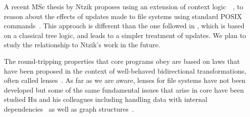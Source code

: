 A recent MSc thesis by Ntzik proposes using an extension of context
logic~\cite{context-logic}~\cite{segment-logic}, to reason about the
effects of updates made to file systems using standard POSIX
commands~\cite{ntzik-msc}. This approach is different than the one
followed in \forest{}, which is based on a classical tree logic, and
leads to a simpler treatment of updates. We plan to study the
relationship to Ntzik's work in the future.

The round-tripping properties that core \forest{} programs obey are
based on laws that have been proposed in the context of well-behaved
bidirectional transformations, often called lenses~\cite{lenses}. As
far as we are aware, lenses for file systems have not been developed
but some of the same fundamental issues that arise in core \forest{}
have been studied Hu and his colleagues including handling data with
internal dependencies~\cite{MuAlgebraic2004} as well as graph
structures~\cite{hidaka-graphs}.
